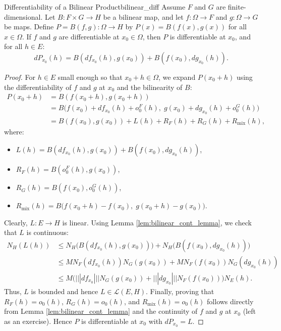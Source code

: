 \documentclass[11pt, a4paper]{article}
\begin{document}
\begin{proposition}{Differentiability of a Bilinear Product}{bilinear_diff}
Assume $F$ and $G$ are finite-dimensional. Let $B: F \times G \to H$ be a bilinear map, and let $f: \Omega \to F$ and $g: \Omega \to G$ be maps. Define $P = B(f, g): \Omega \to H$ by $P(x) = B(f(x), g(x))$ for all $x \in \Omega$.
If $f$ and $g$ are differentiable at $x_0 \in \Omega$, then $P$ is differentiable at $x_0$, and for all $h \in E$:
\[
dP_{x_0}(h) = B(df_{x_0}(h), g(x_0)) + B(f(x_0), dg_{x_0}(h)).
\]
\end{proposition}
\begin{proof}
For $h \in E$ small enough so that $x_0 + h \in \Omega$, we expand $P(x_0 + h)$ using the differentiability of $f$ and $g$ at $x_0$ and the bilinearity of $B$:
\begin{align*}
P(x_0 + h) &= B(f(x_0 + h), g(x_0 + h)) \\
&= B\big(f(x_0) + df_{x_0}(h) + o_0^F(h), \; g(x_0) + dg_{x_0}(h) + o_0^G(h)\big) \\
&= B(f(x_0), g(x_0)) + L(h) + R_F(h) + R_G(h) + R_{\text{mix}}(h),
\end{align*}
where:
\begin{itemize}
    \item $L(h) = B(df_{x_0}(h), g(x_0)) + B(f(x_0), dg_{x_0}(h))$,
    \item $R_F(h) = B(o_0^F(h), g(x_0))$,
    \item $R_G(h) = B(f(x_0), o_0^G(h))$,
    \item $R_{\text{mix}}(h) = B\big(f(x_0 + h) - f(x_0), \; g(x_0 + h) - g(x_0)\big)$.
\end{itemize}
Clearly, $L: E \to H$ is linear. Using Lemma \ref{lem:bilinear_cont_lemma}, we check that $L$ is continuous:
\begin{align*}
N_H(L(h)) &\le N_H\big(B(df_{x_0}(h), g(x_0))\big) + N_H\big(B(f(x_0), dg_{x_0}(h))\big) \\
&\le M N_F(df_{x_0}(h)) N_G(g(x_0)) + M N_F(f(x_0)) N_G(dg_{x_0}(h)) \\
&\le M \big( |||df_{x_0}||| N_G(g(x_0)) + |||dg_{x_0}||| N_F(f(x_0)) \big) N_E(h).
\end{align*}
Thus, $L$ is bounded and hence $L \in \mathcal{L}(E, H)$.
Finally, proving that $R_F(h) = o_0(h)$, $R_G(h) = o_0(h)$, and $R_{\text{mix}}(h) = o_0(h)$ follows directly from Lemma \ref{lem:bilinear_cont_lemma} and the continuity of $f$ and $g$ at $x_0$ (left as an exercise). Hence $P$ is differentiable at $x_0$ with $dP_{x_0} = L$.
\end{proof}
\end{document}
